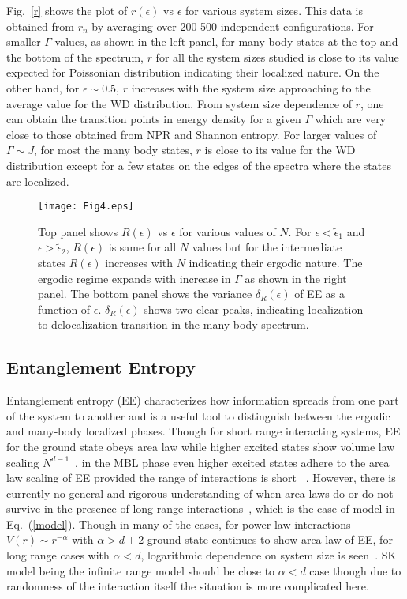 \documentclass[prl,aps,twocolumn,floats,nofootinbib]{revtex4}
\begin{document}
Fig.~\ref{r} shows the plot of $r(\epsilon)$ vs $\epsilon$ for various system sizes. This data is obtained from $r_n$ by averaging over 200-500 independent configurations. For smaller $\Gamma$ values, as shown in the left panel, for many-body states at the top and the bottom of the spectrum, $r$ for all the system sizes studied is close to its value expected for Poissonian distribution indicating their localized nature. On the other hand, for $\epsilon \sim 0.5$, $r$ increases with the system size approaching to the average value for the WD distribution. From system size dependence of $r$, one can obtain the transition points in energy density for a given $\Gamma$ which are very close to those obtained from NPR and Shannon entropy. For larger values of $\Gamma\sim J$, for most the many body states, $r$ is close to its value for the WD distribution except for a few states on the edges of the spectra where the states are localized. 
\begin{figure}[h!]
\begin{center}
\texttt{[image: Fig4.eps]}
\caption{Top panel shows $R(\epsilon)$ vs $\epsilon$ for various values of $N$. For $\epsilon< \tilde{\epsilon}_1$ and $\epsilon > \tilde{\epsilon}_2$, $R(\epsilon)$ is same for all $N$ values but for the intermediate states $R(\epsilon)$ increases with $N$ indicating their ergodic nature. The ergodic regime expands with increase in $\Gamma$ as shown in the right panel. The bottom panel shows the variance $\delta_R(\epsilon)$ of EE as a function of $\epsilon$. $\delta_R(\epsilon)$ shows two clear peaks, indicating localization to delocalization transition in the many-body spectrum. 
 }
\label{Renyi}
\end{center}
\end{figure}
\subsection{Entanglement Entropy}
Entanglement entropy (EE) characterizes how information spreads from one part of the system to another and is a useful tool to distinguish between the ergodic and many-body localized phases. Though for short range interacting systems, EE for the ground state obeys area law while higher excited states show volume law scaling $N^{d-1}$~\cite{area_law}, in the MBL phase even higher excited states adhere to the area law scaling of EE provided the range of interactions is short ~\cite{Nayak,Huse2013,Sdsarma}. However, there is currently no general and rigorous understanding of when area laws do or do not survive in the presence of long-range interactions~\cite{LR_area1,LR_area2}, which is the case of model in Eq.~(\ref{model}). Though in many of the cases, for power law interactions $V(r) \sim r^{-\alpha}$ with $\alpha > d+2$ ground state continues to show area law of EE, for long range cases with $\alpha < d$, logarithmic dependence on system size is seen~\cite{LR_area2}. SK model being the infinite range model should be close to $\alpha < d$ case though due to randomness of the interaction itself the situation is more complicated here. 
\end{document}
